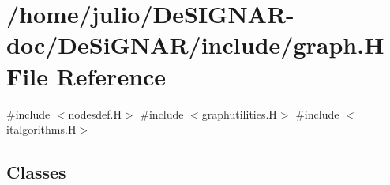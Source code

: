 \hypertarget{graph_8_h}{}\section{/home/julio/\+De\+S\+I\+G\+N\+A\+R-\/doc/\+De\+Si\+G\+N\+A\+R/include/graph.H File Reference}
\label{graph_8_h}
{\ttfamily \#include $<$nodesdef.\+H$>$}\newline
{\ttfamily \#include $<$graphutilities.\+H$>$}\newline
{\ttfamily \#include $<$italgorithms.\+H$>$}\newline
\subsection*{Classes}
